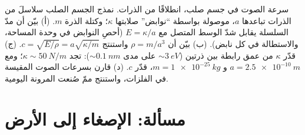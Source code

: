 \begin{exercise}[$\star\star\star$]\label{exo:b3:continuum-elasticity:12}
سرعة الصوت في جسم صلب، انطلاقًا من الذرات. نمذج الجسم الصلب
سلاسلَ من الذرات تباعدها $a$، موصولة بواسطة ``نوابض'' صلابتها $\kappa$؛
وكتلة الذرة $m$. (أ) بيّن أن مدّ السلسلة يقابل شدّ الوسط
المتصل مع $E = \kappa/a$ (أحصِ النوابض في وحدة المساحة،
والاستطالة في كل نابض). (ب) بيّن أن $\rho = m/a^3$ واستنتج $c =
\sqrt{E/\rho} = a\sqrt{\kappa/m}$. (ج) قدّر $\kappa$ من عمق
رابطة بين ذرتين ($\sim\qty{3}{eV}$ على مدى $\sim
\qty{0.1}{nm}$): تجد $\kappa \sim \qty{50}{N/m}$؛ ومع $a =
\qty{2.5e-10}{m}$ و $m = \qty{1e-25}{kg}$، قدّر $c$. (د) قارن
بسرعات الصوت المقيسة في الفلزات، واستنتج ممّ صُنعت المرونة
اليومية.
\end{exercise}

\section{مسألة: الإصغاء إلى الأرض}


